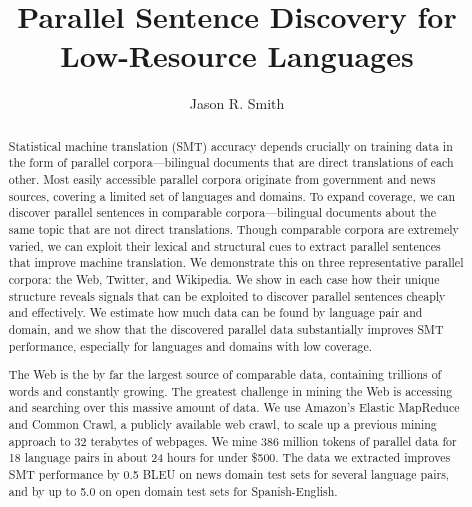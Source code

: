 \title{Parallel Sentence Discovery for Low-Resource Languages}

\author{Jason R. Smith}
\dissertation
\doctorphilosophy
\copyrightnotice

\maketitle

\begin{abstract}
Statistical machine translation (SMT) accuracy depends crucially on training
data in the form of parallel corpora---bilingual documents that are direct
translations of each other. Most easily accessible parallel corpora originate
from government and news sources, covering a limited set of languages and
domains. To expand coverage, we can discover parallel sentences in comparable
corpora---bilingual documents about the same topic that are not direct
translations. Though comparable corpora are extremely varied, we can exploit
their lexical and structural cues to extract parallel sentences that improve machine
translation. We demonstrate this on three representative parallel corpora: the
Web, Twitter, and Wikipedia. We show in each case how their unique structure
reveals signals that can be exploited to discover parallel sentences cheaply and
effectively. We estimate how much data can be found by language pair and domain,
and we show that the discovered parallel data substantially improves SMT
performance, especially for languages and domains with low coverage.

The Web is the by far the largest source of comparable data, containing
trillions of words and constantly growing. The greatest challenge in mining the
Web is accessing and searching over this massive amount of data.
We use Amazon's Elastic MapReduce and 
Common Crawl, a publicly available web crawl, to scale up a previous mining
approach \citep{Resnik03} to 32 terabytes of webpages. 
We mine 386
million tokens of parallel data for 18 language pairs in about 24 hours for under \$500.
The data we extracted improves SMT performance by
0.5 BLEU on news domain test sets for several language pairs,
and by up to 5.0 on open domain test sets for Spanish-English.


\end{abstract}
